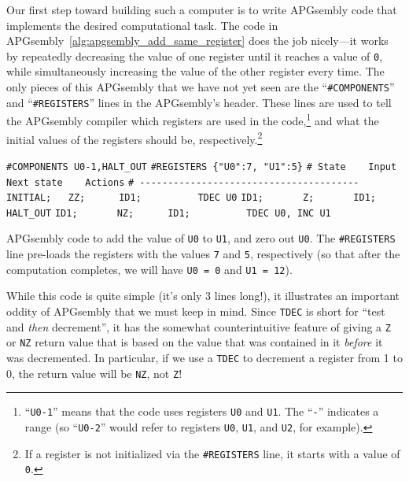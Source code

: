 Our first step toward building such a computer is to write APGsembly code that implements the desired computational task. The code in APGsembly~\ref{alg:apgsembly_add_same_register} does the job nicely---it works by repeatedly decreasing the value of one register until it reaches a value of \texttt{0}, while simultaneously increasing the value of the other register every time. The only pieces of this APGsembly that we have not yet seen are the ``\texttt{\#COMPONENTS}'' and ``\texttt{\#REGISTERS}'' lines in the APGsembly's header. These lines are used to tell the APGsembly compiler which registers are used in the code,\footnote{``\texttt{U0-1}'' means that the code uses registers \texttt{U0} and \texttt{U1}. The ``\texttt{-}'' indicates a range (so ``\texttt{U0-2}'' would refer to registers \texttt{U0}, \texttt{U1}, and \texttt{U2}, for example).} and what the initial values of the registers should be, respectively.\footnote{If a register is not initialized via the \texttt{\#REGISTERS} line, it starts with a value of \texttt{0}.}

\begin{apgsembly}
	\begin{algorithmic}\small
		\State \verb|#COMPONENTS U0-1,HALT_OUT|
		\State \verb|#REGISTERS {"U0":7, "U1":5}|
		\State \verb|# State    Input    Next state    Actions|
		\State \verb|# ---------------------------------------|
		\State \verb|INITIAL;   ZZ;      ID1;          TDEC U0|
		\State \verb|ID1;       Z;       ID1;          HALT_OUT|
		\State \verb|ID1;       NZ;      ID1;          TDEC U0, INC U1|
	\end{algorithmic}
	\caption{APGsembly code to add the value of \texttt{U0} to \texttt{U1}, and zero out \texttt{U0}. The \texttt{\#REGISTERS} line pre-loads the registers with the values \texttt{7} and \texttt{5}, respectively (so that after the computation completes, we will have \texttt{U0 = 0} and \texttt{U1 = 12}).}\label{alg:apgsembly_add_same_register}
\end{apgsembly}

While this code is quite simple (it's only $3$ lines long!), it illustrates an important oddity of APGsembly that we must keep in mind. Since \texttt{TDEC} is short for ``test and \emph{then} decrement'', it has the somewhat counterintuitive feature of giving a \texttt{Z} or \texttt{NZ} return value that is based on the value that was contained in it \emph{before} it was decremented. In particular, if we use a \texttt{TDEC} to decrement a register from 1 to 0, the return value will be \texttt{NZ}, not \texttt{Z}!

